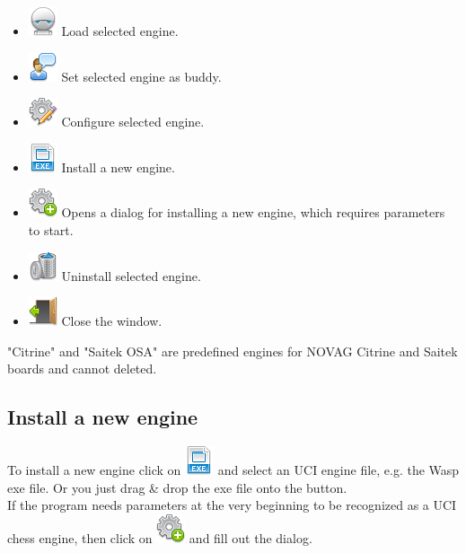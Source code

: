 \documentclass[11pt,a4paper]{article}
\begin{document}
\begin{itemize}
	\item \includegraphics[scale=0.5]{robot.png} Load selected engine.
    \item \includegraphics[scale=0.5]{user_comment.png} Set selected engine as buddy.
	\item \includegraphics[scale=0.5]{cog_edit.png} Configure selected engine.
	\item \includegraphics[scale=0.5]{file_extension_exe.png} Install a new engine.
    \item \includegraphics[scale=0.5]{cog_add.png} Opens a dialog for installing a new engine, which requires parameters to start.
	\item \includegraphics[scale=0.5]{bin.png} Uninstall selected engine.
	\item \includegraphics[scale=0.5]{door_out.png} Close the window.
\end{itemize}
"Citrine" and "Saitek OSA" are predefined engines for NOVAG Citrine and Saitek boards and cannot deleted.\\

\subsection{Install a new engine} \label{InstallEngine}

To install a new engine click on \includegraphics[scale=0.5]{file_extension_exe.png} and select an UCI engine file, e.g. the Wasp exe file. Or you just drag \& drop the exe file onto the button.\\
If the program needs parameters at the very beginning to be recognized as a UCI chess engine, then click on \includegraphics[scale=0.5]{cog_add.png} and fill out the dialog.\\
\end{document}
